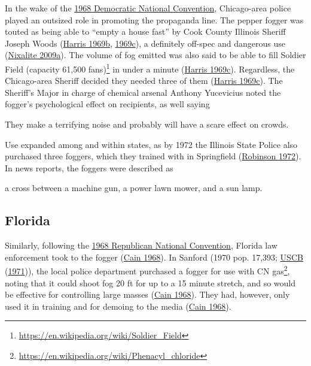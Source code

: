 \documentclass[
  11pt,
]{krantz}
\renewenvironment{quote}{\begin{VF}}{\end{VF}}
\renewcommand{\href}[2]{#2\footnote{\url{#1}}}
\begin{document}
In the wake of the \protect\hyperlink{ChicagoIL1968_08_26}{1968 Democratic National Convention}, Chicago-area police played an outsized role in promoting the propaganda line.
The pepper fogger was touted as being able to ``empty a house fast'' by Cook County Illinois Sheriff Joseph Woods (\protect\hyperlink{ref-MtVernonRegisterNews1969_04_09}{Harris 1969b}, \protect\hyperlink{ref-DailyDispatch1969_04_09}{1969c}), a definitely off-spec and dangerous use (\protect\hyperlink{ref-Nixalite2009b}{Nixalite 2009a}).
The volume of fog emitted was also said to be able to fill \href{https://en.wikipedia.org/wiki/Soldier_Field}{Soldier Field (capacity 61,500 fans)} in under a minute (\protect\hyperlink{ref-DailyDispatch1969_04_09}{Harris 1969c}).
Regardless, the Chicago-area Sheriff decided they needed three of them (\protect\hyperlink{ref-DailyDispatch1969_04_09}{Harris 1969c}).
The Sheriff's Major in charge of chemical arsenal Anthony Yucevicius noted the fogger's psychological effect on recipients, as well saying

\begin{quote}
They make a terrifying noise and probably will have a scare effect on crowds.

\end{quote}

Use expanded among and within states, as by 1972 the Illinois State Police also purchased three foggers, which they trained with in Springfield (\protect\hyperlink{ref-Robinson1972}{Robinson 1972}).
In news reports, the foggers were described as

\begin{quote}
a cross between a machine gun, a power lawn mower, and a sun lamp.

\end{quote}

\hypertarget{florida}{%
\subsection{Florida}\label{florida}}

Similarly, following the \protect\hyperlink{MiamiFL1968_08_08}{1968 Republican National Convention}, Florida law enforcement took to the fogger (\protect\hyperlink{ref-Cain1968}{Cain 1968}).
In Sanford (1970 pop. 17,393; \protect\hyperlink{ref-USCB1970}{USCB} (\protect\hyperlink{ref-USCB1970}{1971})), the local police department purchased a fogger for use with \href{https://en.wikipedia.org/wiki/Phenacyl_chloride}{CN gas}, noting that it could shoot fog 20 ft for up to a 15 minute stretch, and so would be effective for controlling large masses (\protect\hyperlink{ref-Cain1968}{Cain 1968}).
They had, however, only used it in training and for demoing to the media (\protect\hyperlink{ref-Cain1968}{Cain 1968}).
\end{document}
